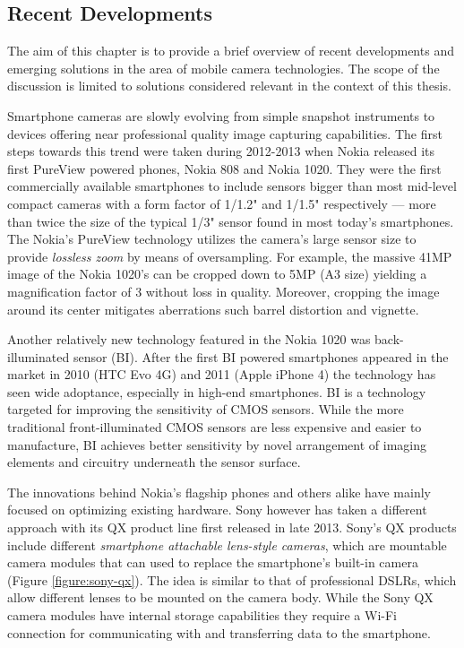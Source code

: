 \documentclass[thesis.tex]{subfiles}
\begin{document}
\subsection{Recent Developments}\label{chapter:solutions}

The aim of this chapter is to provide a brief overview of recent developments and emerging solutions in the area of mobile camera technologies. The scope of the discussion is limited to solutions considered relevant in the context of this thesis.

Smartphone cameras are slowly evolving from simple snapshot instruments to devices offering near professional quality image capturing capabilities. The first steps towards this trend were taken during 2012-2013 when Nokia released its first PureView powered phones, Nokia 808 and Nokia 1020. They were the first commercially available smartphones to include sensors bigger than most mid-level compact cameras with a form factor of 1/1.2" and 1/1.5" respectively --- more than twice the size of the typical 1/3" sensor found in most today's smartphones. The Nokia's PureView technology utilizes the camera's large sensor size to provide \textit{lossless zoom} by means of oversampling. For example, the massive 41MP image of the Nokia 1020's can be cropped down to 5MP (A3 size) yielding a magnification factor of 3 without loss in quality. Moreover, cropping the image around its center mitigates aberrations such barrel distortion and vignette. \cite{lumia_1020}

Another relatively new technology featured in the Nokia 1020 was back-illuminated sensor (BI). After the first BI powered smartphones appeared in the market in 2010 (HTC Evo 4G) and 2011 (Apple iPhone 4) the technology has seen wide adoptance, especially in high-end smartphones. BI is a technology targeted for improving the sensitivity of CMOS sensors. While the more traditional front-illuminated CMOS sensors are less expensive and easier to manufacture, BI achieves better sensitivity by novel arrangement of imaging elements and circuitry underneath the sensor surface.

The innovations behind Nokia's flagship phones and others alike have mainly focused on optimizing existing hardware. Sony however has taken a different approach with its QX product line first released in late 2013. Sony's QX products include different \textit{smartphone attachable lens-style cameras}, which are mountable camera modules that can used to replace the smartphone's built-in camera (Figure \ref{figure:sony-qx}). The idea is similar to that of professional DSLRs, which allow different lenses to be mounted on the camera body. While the Sony QX camera modules have internal storage capabilities they require a Wi-Fi connection for communicating with and transferring data to the smartphone.
\end{document}
